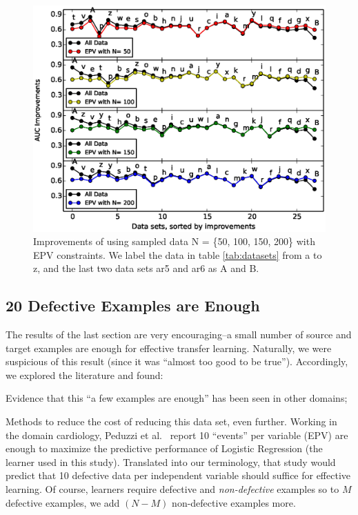 \begin{figure}[t]
	\centering
	\includegraphics[width=\linewidth]{Figures/raleigh/sample_epv.eps}
	\caption{Improvements of using sampled data N  = \{50, 100, 150, 200\} with EPV constraints. We label the data in table \ref{tab:datasets} from a to z, and the last two data sets ar5 and ar6 as A and B.}
	\label{fig:small_epv}
\end{figure}


\subsection{20 Defective Examples  are Enough}


The results of the last section are very encouraging--\lin{---}a small number of source
and target examples are enough for effective transfer learning. Naturally,
we were suspicious of this result (since it was ``almost too good to be true'').
Accordingly, we explored the literature and found:
\bi
\item Evidence that this ``a few examples are enough'' has been seen in other domains; 
\item Methods to reduce the cost of reducing this data set, even further. 
  \ei
Working in the domain cardiology,
  Peduzzi et al.~\cite{peduzzi1996simulation}
  report 10 ``events'' per variable (EPV) are enough to maximize the predictive performance
  of  Logistic Regression (the learner used in this study). Translated into our terminology,
  that study would predict that  10 defective data per independent variable should
  suffice for effective learning. Of course, learners require defective and {\em non-defective}
  examples so to $M$ defective examples, we add $(N-M)$ non-defective examples more.

